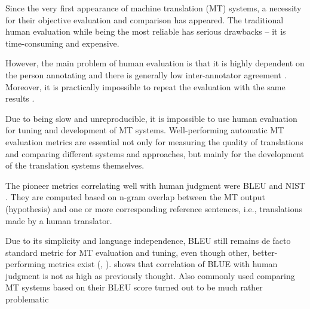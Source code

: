 



Since the very first appearance of machine translation (MT) systems, a 
necessity for their objective evaluation and comparison has appeared. The 
traditional human evaluation while being the most reliable has serious 
drawbacks -- it is time-consuming and expensive.

However, the main problem of human evaluation is that it is highly dependent on 
the person annotating and there is generally low inter-annotator agreement 
\cite{wmt13}. Moreover, it is practically impossible to repeat the evaluation 
with the same results \cite{bojar-kniha}. 

Due to being slow and unreproducible, it is impossible to use human evaluation
for tuning and development of MT systems. Well-performing automatic MT 
evaluation metrics are essential not only for measuring the quality of translations 
and comparing different systems and approaches, but mainly for the development 
of the translation systems themselves. 



The pioneer metrics correlating well with human judgment were BLEU \cite{bleu} 
and NIST \citep{nist}. They are computed based on n-gram overlap between the 
MT output (hypothesis) and one or more corresponding reference sentences, i.e., 
translations made by a human translator.

Due to its simplicity and language independence, BLEU still remains de facto
standard metric for MT evaluation and tuning, even though other, 
better-performing metrics exist (\cite{wmt13-metrics}, \cite{wmt14}). 
\cite{callison2006re} shows that correlation of BLUE with human judgment is 
not as high as previously thought. Also commonly used comparing MT systems
based on their BLEU score turned out to be much rather problematic \cite{tenMattPost}

